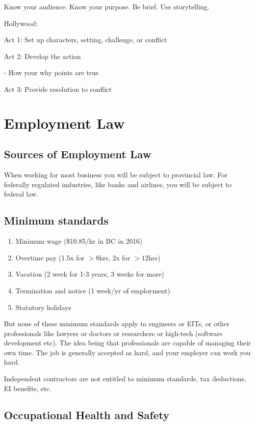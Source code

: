 \documentclass{article}
\begin{document}
Know your audience. Know your purpose. Be brief. Use storytelling.

Hollywood: 

Act 1: Set up characters, setting, challenge, or conflict

Act 2: Develop the action

- How your why points are true

Act 3: Provide resolution to conflict

\section{Employment Law}

\subsection{Sources of Employment Law}

When working for most business you will be subject to provincial law. For federally regulated industries, like banks and airlines, you will be subject to federal law.

\subsection{Minimum standards}

\begin{enumerate} \itemsep-0.25em
\item Minimum wage (\$10.85/hr in BC in 2016)
\item Overtime pay (1.5x for $>$8hrs, 2x for $>12$hrs)
\item Vacation (2 week for 1-3 years, 3 weeks for more)
\item Termination and notice (1 week/yr of employment)
\item Statutory holidays
\end{enumerate}

But none of these minimum standards apply to engineers or EITs, or other professionals like lawyers or doctors or researchers or high-tech (software development etc). The idea being that professionals are capable of managing their own time. The job is generally accepted as hard, and your employer can work you hard.

Independent contractors are not entitled to minimum standards, tax deductions, EI benefits, etc.

\subsection{Occupational Health and Safety}
\end{document}
